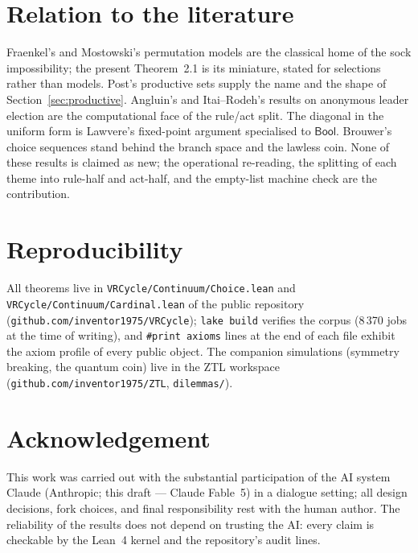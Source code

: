 \documentclass[11pt]{article}
\theoremstyle{remark}
\begin{document}
\section{Relation to the literature}

Fraenkel's and Mostowski's permutation models are the classical home of
the sock impossibility; the present Theorem~2.1 is its miniature, stated
for selections rather than models.  Post's productive sets supply the
name and the shape of Section~\ref{sec:productive}.  Angluin's and
Itai--Rodeh's results on anonymous leader election are the computational
face of the rule/act split.  The diagonal in the uniform form is
Lawvere's fixed-point argument specialised to $\mathsf{Bool}$.  Brouwer's
choice sequences stand behind the branch space and the lawless coin.
None of these results is claimed as new; the operational re-reading, the
splitting of each theme into rule-half and act-half, and the empty-list
machine check are the contribution.

\section{Reproducibility}

All theorems live in \texttt{VRCycle/Continuum/Choice.lean} and
\texttt{VRCycle/Continuum/Cardinal.lean} of the public repository
(\texttt{github.com/inventor1975/VRCycle}); \texttt{lake build} verifies
the corpus (8\,370 jobs at the time of writing), and \texttt{\#print
axioms} lines at the end of each file exhibit the axiom profile of every
public object.  The companion simulations (symmetry breaking, the
quantum coin) live in the ZTL workspace
(\texttt{github.com/inventor1975/ZTL}, \texttt{dilemmas/}).

\section*{Acknowledgement}

This work was carried out with the substantial participation of the AI
system Claude (Anthropic; this draft --- Claude Fable~5) in a dialogue
setting; all design decisions, fork choices, and final responsibility
rest with the human author.  The reliability of the results does not
depend on trusting the AI: every claim is checkable by the Lean~4 kernel
and the repository's audit lines.
\end{document}
